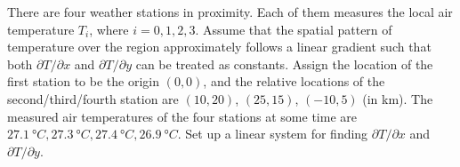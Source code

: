 \begin{exmp}
\label{exmp:weatherstats}
There are four weather stations in proximity. Each of them measures the local air temperature $T_i$, where $i = 0,1,2,3$. Assume that the spatial pattern of temperature over the region approximately follows a linear gradient such that both $\partial T/\partial x$ and $\partial T/\partial y$ can be treated as constants. Assign the location of the first station to be the origin $(0,0)$, and the relative locations of the second/third/fourth station are $(10,20)$, $(25,15)$, $(-10,5)$ (in \si{\km}). The measured air temperatures of the four stations at some time are $\SI{27.1}{\degree C}, \SI{27.3}{\degree C}, \SI{27.4}{\degree C}, \SI{26.9}{\degree C}$. Set up a linear system for finding $\partial T/\partial x$ and $\partial T/\partial y$.
\end{exmp}

